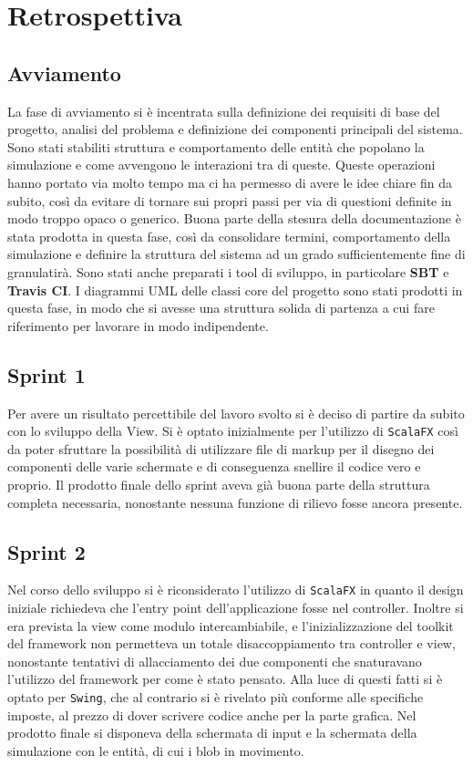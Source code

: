\chapter{Retrospettiva}

\section{Avviamento}
La fase di avviamento si è incentrata sulla definizione dei requisiti di base del progetto, analisi del problema e definizione dei componenti principali del sistema. Sono stati stabiliti struttura e comportamento delle entità che popolano la simulazione e come avvengono le interazioni tra di queste. Queste operazioni hanno portato via molto tempo ma ci ha permesso di avere le idee chiare fin da subito, così da evitare di tornare sui propri passi per via di questioni definite in modo troppo opaco o generico. Buona parte della stesura della documentazione è stata prodotta in questa fase, così da consolidare termini, comportamento della simulazione e definire la struttura del sistema ad un grado sufficientemente fine di granulatirà. Sono stati anche preparati i tool di sviluppo, in particolare \textbf{SBT} e \textbf{Travis CI}. I diagrammi UML delle classi core del progetto sono stati prodotti in questa fase, in modo che si avesse una struttura solida di partenza a cui fare riferimento per lavorare in modo indipendente.

\section{Sprint 1}
Per avere un risultato percettibile del lavoro svolto si è deciso di partire da subito con lo sviluppo della View. Si è optato inizialmente per l'utilizzo di \texttt{ScalaFX} così da poter sfruttare la possibilità di utilizzare file di markup per il disegno dei componenti delle varie schermate e di conseguenza snellire il codice vero e proprio. Il prodotto finale dello sprint aveva già buona parte della struttura completa necessaria, nonostante nessuna funzione di rilievo fosse ancora presente.

\section{Sprint 2}
Nel corso dello sviluppo si è riconsiderato l'utilizzo di \texttt{ScalaFX} in quanto il design iniziale richiedeva che l'entry point dell'applicazione fosse nel controller. Inoltre si era prevista la view come modulo intercambiabile, e l'inizializzazione del toolkit del framework non permetteva un totale disaccoppiamento tra controller e view, nonostante tentativi di allacciamento dei due componenti che snaturavano l'utilizzo del framework per come è stato pensato. Alla luce di questi fatti si è optato per \texttt{Swing}, che al contrario si è rivelato più conforme alle specifiche imposte, al prezzo di dover scrivere codice anche per la parte grafica. Nel prodotto finale si disponeva della schermata di input e la schermata della simulazione con le entità, di cui i blob in movimento.

